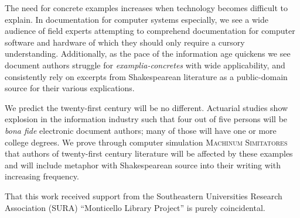 \documentclass[12pt]{report}
\begin{document}
The need for concrete examples increases when technology becomes
difficult to explain.  In documentation for computer systems
especially, we see a wide audience of field experts attempting to
comprehend documentation for computer software and hardware of which
they should only require a cursory understanding.  Additionally, as
the pace of the information age quickens we see document authors
struggle for \textit{examplia-concretes} with wide applicability, and
consistently rely on excerpts from Shakespearean literature as a
public-domain source for their various explications.

We predict the twenty-first century will be no different.  Actuarial
studies show explosion in the information industry such that four out
of five persons will be \textit{bona fide} electronic document
authors; many of those will have one or more college degrees.  We
prove through computer simulation \textsc{Machinum Simitatores} that
authors of twenty-first century literature will be affected by these
examples and will include metaphor with Shakespearean source into
their writing with increasing frequency.

\vfill


That this work received support from the Southeastern Universities
Research Association (SURA) ``Monticello Library Project'' is purely
coincidental.

\pagebreak



\tableofcontents
\pagebreak

\listoffigures
\pagebreak

\listoftables
\pagebreak

\pagestyle{myheadings}












%


\end{document}
